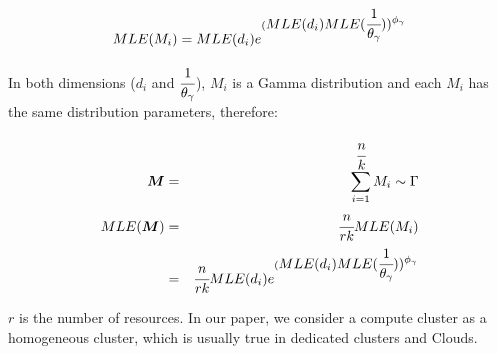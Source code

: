 \documentclass{IOS-Book-Article}
\begin{document}
\begin{equation} 
\label{eq:MLE-M-i}
MLE(M_i)=MLE(d_i)e^{(\displaystyle MLE(d_i)MLE(\cfrac{1}{\theta_{\gamma}}))^{\phi_{\gamma}}} 
\end{equation}

In both dimensions ($d_i$ and $\displaystyle\cfrac{1}{\theta_{\gamma}}$), $M_i$ is a Gamma distribution and each $M_i$ has the same distribution parameters, therefore:

\begin{eqnarray} 
\label{eq:MLE-M}
\bm{M}&=&\displaystyle\sum_{i=1}^{\cfrac{n}{k}}M_i\sim\Gamma \nonumber\\
MLE(\bm{M})&=&\displaystyle\cfrac{n}{rk}MLE(M_i)\\
&=&\displaystyle\cfrac{n}{rk} MLE(d_i)e^{(\displaystyle MLE(d_i)MLE(\cfrac{1}{\theta_{\gamma}}))^{\phi_{\gamma}}} 
\end{eqnarray}

$r$ is the number of resources. In our paper, we consider a compute cluster as a homogeneous cluster, which is usually true in dedicated clusters and Clouds. 


\end{document}
